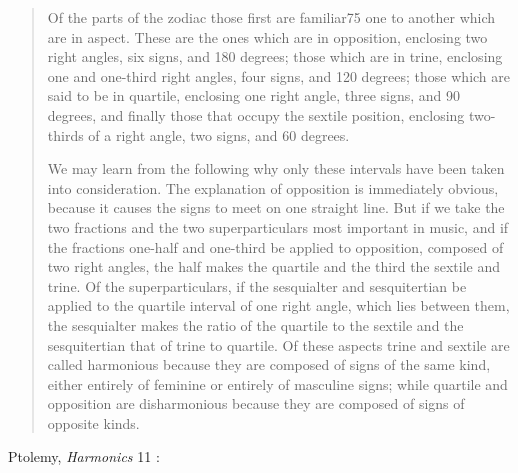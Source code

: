 \documentclass{article}
\theoremstyle{definition}
\begin{document}
\begin{quote}
Of the parts of the zodiac those first are familiar75 one to another which are in aspect. These are the ones which are in opposition, enclosing two right angles, six signs, and 180 degrees; those which are in trine, enclosing one and one-third right angles, four signs, and 120 degrees; those which are said to be in quartile, enclosing one right angle, three signs, and 90 degrees, and finally those that occupy the sextile position, enclosing two-thirds of a right angle, two signs, and 60 degrees.

We may learn from the following why only these intervals have been taken into consideration. The explanation of opposition is immediately obvious, because it causes the signs to meet on one straight line. But if we take the two fractions and the two superparticulars most important in music, and if the fractions one-half and one-third be applied to opposition, composed of two right angles, the half makes the quartile and the third the sextile and trine. Of the superparticulars, if the sesquialter and sesquitertian be applied to the quartile interval of one right angle, which lies between them, the sesquialter makes the ratio of the quartile to the sextile and the sesquitertian that of trine to quartile. Of these aspects trine and sextile are called
harmonious because they are composed of signs of the same kind, either entirely of feminine or entirely of masculine signs; while quartile and opposition are disharmonious because they are composed of signs of opposite kinds.
\end{quote}

Ptolemy, {\em Harmonics} 11 \cite[pp.~284--285]{barker}:
\end{document}
